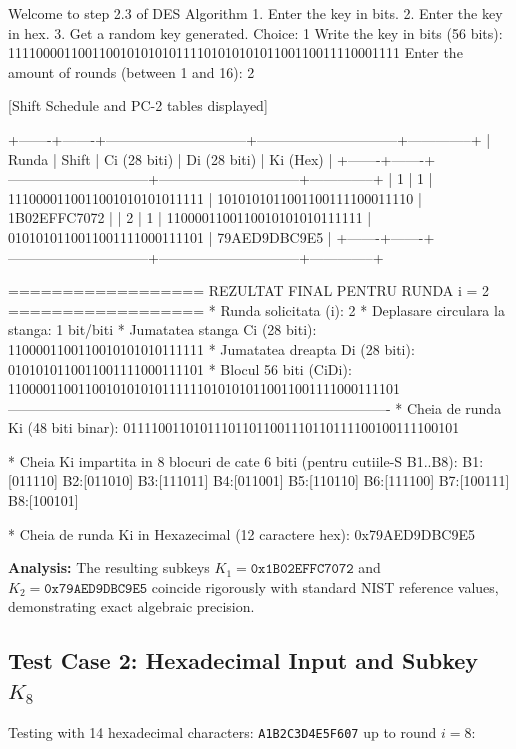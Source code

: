 \documentclass[12pt,a4paper]{article}
\begin{document}
\begin{terminalwindow}
Welcome to step 2.3 of DES Algorithm
1. Enter the key in bits.
2. Enter the key in hex.
3. Get a random key generated.
Choice: 1
Write the key in bits (56 bits): 11110000110011001010101011110101010101100110011110001111
Enter the amount of rounds (between 1 and 16): 2

[Shift Schedule and PC-2 tables displayed]

+-------+-------+------------------------------+------------------------------+--------------+
| Runda | Shift | Ci (28 biti)                 | Di (28 biti)                 | Ki (Hex)     |
+-------+-------+------------------------------+------------------------------+--------------+
| 1     | 1     | 1110000110011001010101011111 | 1010101011001100111100011110 | 1B02EFFC7072 |
| 2     | 1     | 1100001100110010101010111111 | 0101010110011001111000111101 | 79AED9DBC9E5 |
+-------+-------+------------------------------+------------------------------+--------------+

================== REZULTAT FINAL PENTRU RUNDA i = 2 ==================
  * Runda solicitata (i):           2
  * Deplasare circulara la stanga:  1 bit/biti
  * Jumatatea stanga Ci (28 biti):  1100001100110010101010111111
  * Jumatatea dreapta Di (28 biti): 0101010110011001111000111101
  * Blocul 56 biti (CiDi):          11000011001100101010101111110101010110011001111000111101
  ----------------------------------------------------------------------------------
  * Cheia de runda Ki (48 biti binar):
    011110011010111011011001110110111100100111100101

  * Cheia Ki impartita in 8 blocuri de cate 6 biti (pentru cutiile-S B1..B8):
    B1:[011110] B2:[011010] B3:[111011] B4:[011001] B5:[110110] B6:[111100] B7:[100111] B8:[100101]

  * Cheia de runda Ki in Hexazecimal (12 caractere hex):
    0x79AED9DBC9E5
\end{terminalwindow}

\textbf{Analysis:} The resulting subkeys $K_1 = \texttt{0x1B02EFFC7072}$ and $K_2 = \texttt{0x79AED9DBC9E5}$ coincide rigorously with standard NIST reference values, demonstrating exact algebraic precision.

\subsection{Test Case 2: Hexadecimal Input and Subkey $K_8$}
Testing with 14 hexadecimal characters: \texttt{A1B2C3D4E5F607} up to round $i = 8$:
\end{document}
